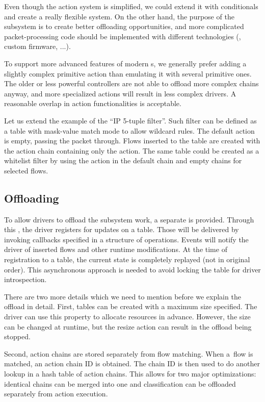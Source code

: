 Even though the action system is simplified, we could extend it with
conditionals and create a really flexible system. On the other hand, the
purpose of the subsystem is to create better offloading opportunities, and more
complicated packet-processing code should be implemented with different
technologies (, custom firmware, ...).

To support more advanced features of modern s, we generally prefer adding
a slightly complex primitive action than emulating it with several primitive ones.
The older or less powerful controllers are not able to offload more complex chains
anyway, and more specialized actions will result in less complex drivers.
A reasonable overlap in action functionalities is acceptable.

Let us extend the example of the ``IP 5-tuple filter''. Such filter can be defined
as a table with mask-value match mode to allow wildcard rules. The default
action is empty, passing the packet through. Flows inserted to the table
are created with the action chain containing only the  action.
The same table could be created as a whitelist filter by using the 
action in the default chain and empty chains for selected flows.

\subsection{Offloading}

To allow  drivers to offload the subsystem work, a separate  is
provided. Through this , the driver registers for updates on a table.
Those will be delivered by invoking callbacks specified in a structure of
operations. Events will notify the driver of inserted flows and other
runtime modifications. At the time of registration to a table, the current
state is completely replayed (not in original order). This asynchronous
approach is needed to avoid locking the table for driver introspection.

There are two more details which we need to mention before we explain the
offload in detail. First, tables can be created with a maximum size specified. The
driver can use this property to allocate resources in advance. However, the
size can be changed at runtime, but the resize action can result in the offload
being stopped.

Second, action chains are stored separately from flow matching. When
a~flow is matched, an action chain ID is obtained. The chain ID is then used to
do another lookup in a hash table of action chains. This allows for two major
optimizations: identical chains can be merged into one and classification can
be offloaded separately from action execution.

